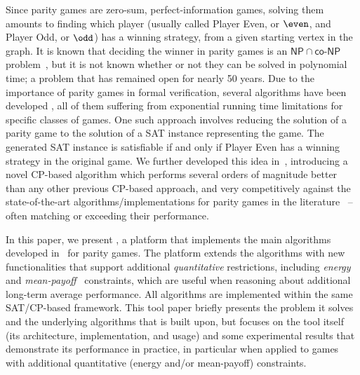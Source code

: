 \documentclass[a4paper,UKenglish,cleveref, autoref, thm-restate, anonymous]{lipics-v2021}
\begin{document}
Since parity games are zero-sum, perfect-information games, solving them amounts to finding which player (usually called Player Even, or $\even$, and Player Odd, or $\odd$) has a winning strategy, from a given starting vertex in the graph. 
It is known that deciding the winner in parity games is an $\mathsf{NP} \cap \mathsf{co\textit{-}NP}$ problem~\cite{Jurdziński:1998}, but it is not known whether or not they can be solved in polynomial time; a problem that has remained open for nearly 50 years. 
Due to the importance of parity games in formal verification, several algorithms have been developed \cite{Aggarwal:2023,Benerecetti:2025,Jurdziński:2000,Jurdziński:2022,Zielonka:1998}, all of them suffering from exponential running time limitations for specific classes of games. 
One such approach involves reducing the solution of a parity game to the solution of a SAT instance representing the game. The generated SAT instance is satisfiable if and only if Player Even has a winning strategy in the original game. 
We further developed this idea in~\cite{Hernandez:2026:noc}, introducing a novel CP-based algorithm which performs several orders of magnitude better than any other previous CP-based approach, and very competitively against the state-of-the-art algorithms/implementations for parity games in the literature~\cite{vanDijk:2018,Benerecetti:2025,Aggarwal:2023} -- often matching or exceeding their performance. 

In this paper, we present \nocq, a platform that implements the main algorithms developed in~\cite{Hernandez:2026:noc} for parity games. The platform extends the algorithms with new functionalities that support additional {\em quantitative} restrictions, including {\em energy}~\cite{ChatterjeeD12} and {\em mean-payoff}~\cite{ChatterjeeHS17} constraints, which are useful when reasoning about additional long-term average performance. All algorithms are implemented within the same SAT/CP-based framework. This tool paper briefly presents the problem it solves and the underlying algorithms that \nocq is built upon, but focuses on the tool itself (its architecture, implementation, and usage) and some experimental results that demonstrate its performance in practice, in particular when applied to games with additional quantitative (energy and/or mean-payoff) constraints. 
\end{document}

